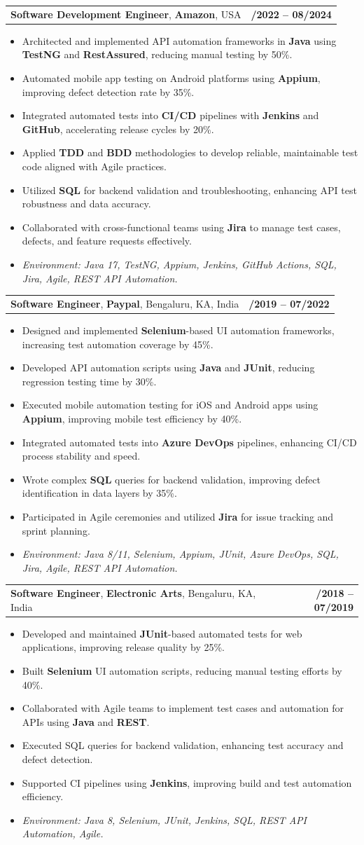 \documentclass[letterpaper,11pt]{article}
\makeatletter
\newcommand{\resumeItem}[1]{
  \item\footnotesize{
    {#1 \vspace{-2pt}}
  }
}
\newcommand{\resumeSubheading}[4]{
  \vspace{-2pt}\item
    \begin{tabular*}{1.0\textwidth}[t]{l@{\extracolsep{\fill}}r}
      \textbf{\fontsize{10pt}{14pt}\selectfont #3}, \textbf{\fontsize{10pt}{14pt}\selectfont #1}, \fontsize{10pt}{14pt}\selectfont #4 & \textbf{\fontsize{10pt}{14pt}\selectfont #2} \\
    \end{tabular*}\vspace{-7pt}
}
\newcommand{\resumeItemListStart}{\begin{itemize}[leftmargin=*]}
\newcommand{\resumeItemListEnd}{\end{itemize}\vspace{-5pt}}
\makeatother
\begin{document}
\resumeSubheading
{Amazon}{10/2022 -- 08/2024}
{Software Development Engineer}{USA}
\resumeItemListStart
  \resumeItem{Architected and implemented API automation frameworks in \textbf{Java} using \textbf{TestNG} and \textbf{RestAssured}, reducing manual testing by 50\%.}
  \resumeItem{Automated mobile app testing on Android platforms using \textbf{Appium}, improving defect detection rate by 35\%.}
  \resumeItem{Integrated automated tests into \textbf{CI/CD} pipelines with \textbf{Jenkins} and \textbf{GitHub}, accelerating release cycles by 20\%.}
  \resumeItem{Applied \textbf{TDD} and \textbf{BDD} methodologies to develop reliable, maintainable test code aligned with Agile practices.}
  \resumeItem{Utilized \textbf{SQL} for backend validation and troubleshooting, enhancing API test robustness and data accuracy.}
  \resumeItem{Collaborated with cross-functional teams using \textbf{Jira} to manage test cases, defects, and feature requests effectively.}
  \resumeItem{\textit{Environment: Java 17, TestNG, Appium, Jenkins, GitHub Actions, SQL, Jira, Agile, REST API Automation.}}
\resumeItemListEnd

\resumeSubheading
{Paypal}{08/2019 -- 07/2022}
{Software Engineer}{Bengaluru, KA, India}
\resumeItemListStart
  \resumeItem{Designed and implemented \textbf{Selenium}-based UI automation frameworks, increasing test automation coverage by 45\%.}
  \resumeItem{Developed API automation scripts using \textbf{Java} and \textbf{JUnit}, reducing regression testing time by 30\%.}
  \resumeItem{Executed mobile automation testing for iOS and Android apps using \textbf{Appium}, improving mobile test efficiency by 40\%.}
  \resumeItem{Integrated automated tests into \textbf{Azure DevOps} pipelines, enhancing CI/CD process stability and speed.}
  \resumeItem{Wrote complex \textbf{SQL} queries for backend validation, improving defect identification in data layers by 35\%.}
  \resumeItem{Participated in Agile ceremonies and utilized \textbf{Jira} for issue tracking and sprint planning.}
  \resumeItem{\textit{Environment: Java 8/11, Selenium, Appium, JUnit, Azure DevOps, SQL, Jira, Agile, REST API Automation.}}
\resumeItemListEnd

\resumeSubheading
{Electronic Arts}{01/2018 -- 07/2019}
{Software Engineer}{Bengaluru, KA, India}
\resumeItemListStart
  \resumeItem{Developed and maintained \textbf{JUnit}-based automated tests for web applications, improving release quality by 25\%.}
  \resumeItem{Built \textbf{Selenium} UI automation scripts, reducing manual testing efforts by 40\%.}
  \resumeItem{Collaborated with Agile teams to implement test cases and automation for APIs using \textbf{Java} and \textbf{REST}.}
  \resumeItem{Executed SQL queries for backend validation, enhancing test accuracy and defect detection.}
  \resumeItem{Supported CI pipelines using \textbf{Jenkins}, improving build and test automation efficiency.}
  \resumeItem{\textit{Environment: Java 8, Selenium, JUnit, Jenkins, SQL, REST API Automation, Agile.}}
\resumeItemListEnd
\end{document}
